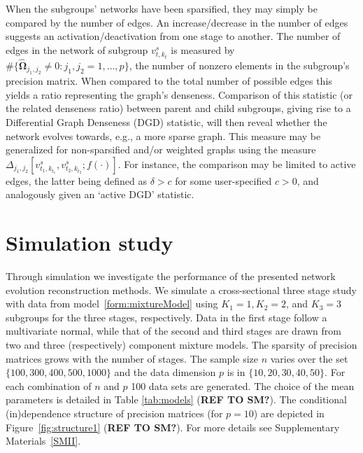 \documentclass[10pt]{article}
\begin{document}
When the subgroups' networks have been sparsified, they may simply be compared by the number of edges. An increase/decrease in the number of edges suggests an activation/deactivation from one stage to another. The number of edges in the network of subgroup $v^s_{t, k_t}$ is measured by $\# \{ \widehat{\mathbf{\Omega}}_{j_1, j_2} \not= 0 : j_1, j_2 =1, \ldots, p \}$, the number of nonzero elements in the subgroup's precision matrix. When compared to the total number of possible edges this yields a ratio representing the graph's denseness. Comparison of this statistic (or the related denseness ratio) between parent and child subgroups, giving rise to a Differential Graph Denseness (DGD) statistic, will then reveal whether the network evolves towards, e.g., a more sparse graph. This measure may be generalized for non-sparsified and/or weighted graphs using the measure $\Delta_{j_1,j_2} [v^s_{t_1, k_{t_1}}, v^s_{t_2, k_{t_2}}; f(\cdot)]$. For instance, the comparison may be limited to active edges, the latter being defined as $\delta > c$ for some user-specified $c > 0$, and analogously given an `active DGD' statistic.






\section{Simulation study}\label{simulation}
Through simulation we investigate the performance of the presented 
network evolution reconstruction methods. We simulate a cross-sectional three stage study with data from model~\eqref{form:mixtureModel} using $K_1=1, K_2=2$, and $K_3=3$ subgroups for the three stages, respectively. Data in the first stage follow a multivariate normal, while that of the second and third stages are drawn from two and three (respectively) component mixture models. The sparsity of precision matrices grows with the number of stages. The sample size $n$ varies over the set $\{ 100, 300,400, 500, 1000 \}$ and the data dimension $p$ is in $\{10,20,30,40,50\}$. For each combination of $n$ and $p$ 100 data sets are generated. The choice of the mean parameters is detailed in Table \ref{tab:models} (\textbf{REF TO SM?}). The conditional (in)dependence structure of precision matrices (for $p=10$) are depicted in Figure~\ref{fig:structure1} (\textbf{REF TO SM?}). %
For more details see Supplementary Materials~\ref{SMII}.
\end{document}
